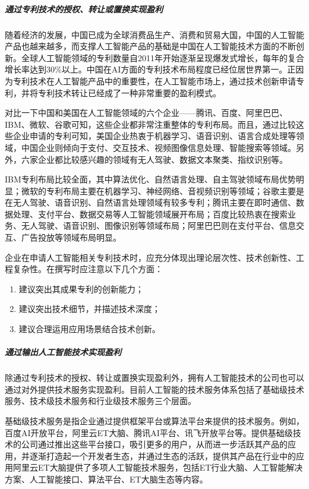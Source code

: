\documentclass[letterpaper,11pt,english]{sphinxmanual}
\begin{document}
\subparagraph{通过专利技术的授权、转让或置换实现盈利}
\label{\detokenize{chapter_introduction/money:id22}}
随着经济的发展，中国已成为全球消费品生产、消费和贸易大国，中国的人工智能产品也越来越多，而支撑人工智能产品的基础是中国在人工智能技术方面的不断创新。全球人工智能领域的专利数量自2011年开始逐渐呈现爆发式增长，每年的复合增长率达到30\%以上。中国在AI方面的专利技术布局程度已经位居世界第一。正因为专利技术在人工智能产品中的重要性，在人工智能市场上，通过技术创新申请专利，并将专利技术转让已经成了一种非常重要的盈利模式。

对比一下中国和美国在人工智能领域的六个企业——腾讯、百度、阿里巴巴、IBM、微软、谷歌可知，这些企业都非常注重整体的专利布局。而且，通过比较这些企业申请的专利可知，美国企业热衷于机器学习、语音识别、语言合成处理等领域，中国企业则倾向于支付、交互技术、视频图像信息处理、智能搜索等领域。另外，六家企业都比较感兴趣的领域有无人驾驶、数据文本聚类、指纹识别等。

IBM专利布局比较全面，其中算法优化、自然语言处理、自主驾驶领域布局优势明显；微软的专利布局主要在机器学习、神经网络、音视频识别等领域；谷歌主要是在无人驾驶、语音识别、自然语言处理领域有较多专利；腾讯主要在即时通信、数据处理、支付平台、数据交易等人工智能领域展开布局；百度比较热衷在搜索业务、无人驾驶、语音识别、图像识别等领域布局；阿里巴巴则在支付平台、信息交互、广告投放等领域布局明显。

企业在申请人工智能相关专利技术时，应充分体现出理论层次性、技术创新性、工程复杂性。在撰写时应注意以下几个方面：
\begin{enumerate}
%
\item {} 
建议突出其成果专利的创新能力；

\item {} 
建议突出技术细节，并描述技术深度；

\item {} 
建议合理运用应用场景结合技术创新。

\end{enumerate}


\subparagraph{通过输出人工智能技术实现盈利}
\label{\detokenize{chapter_introduction/money:id23}}
除通过专利技术的授权、转让或置换实现盈利外，拥有人工智能技术的公司也可以通过对外提供技术服务实现盈利。目前人工智能的技术服务体系包括了基础级技术服务、技术级技术服务和行业级技术服务三个层面。

基础级技术服务是指企业通过提供框架平台或算法平台来提供的技术服务。例如，百度AI开放平台，阿里云ET大脑、腾讯AI平台、讯飞开放平台等。提供基础级技术的公司通过推出这些平台接口，吸引更多的用户，从而进一步活跃其产品的应用，并逐渐打造起一个开发者生态，并通过生态的活跃，提供其产品在行业中的应用阿里云ET大脑提供了多项人工智能技术服务，包括ET行业大脑、人工智能解决方案、人工智能接口、算法平台、ET大脑生态等内容。
\end{document}
